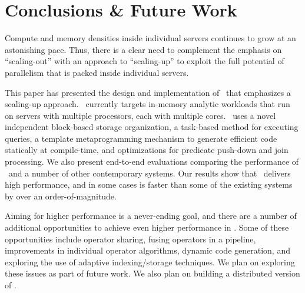 
\section{Conclusions \& Future Work} \label{conclusions}
Compute and memory densities inside individual servers continues to grow at an astonishing pace. %
Thus, there is a clear need to complement the emphasis on ``scaling-out'' with an approach to ``scaling-up'' to exploit the full potential of parallelism that is packed inside individual servers. 


This paper has presented the design and implementation of \Quickstep\ that emphasizes a scaling-up approach. \Quickstep\ currently targets in-memory analytic workloads that run on servers with multiple processors, each with multiple cores. \Quickstep\ uses a novel independent block-based storage organization, a task-based method for executing queries,  a template metaprogramming mechanism to generate efficient code statically at compile-time, and optimizations for predicate push-down and join processing. 
We also present end-to-end evaluations comparing the performance of \Quickstep\ and a number of other contemporary systems. Our results show that \Quickstep\ delivers high performance, and in some cases is faster than some of the existing systems by over an order-of-magnitude. 

Aiming for higher performance is a never-ending goal, and there are a number of additional opportunities to achieve even higher performance in \Quickstep. Some of these opportunities include operator sharing, fusing operators in a pipeline, improvements in individual operator algorithms, dynamic code generation, and exploring the use of adaptive indexing/storage techniques. We plan on exploring these issues as part of future work. We also plan on building a distributed version of \Quickstep. 

